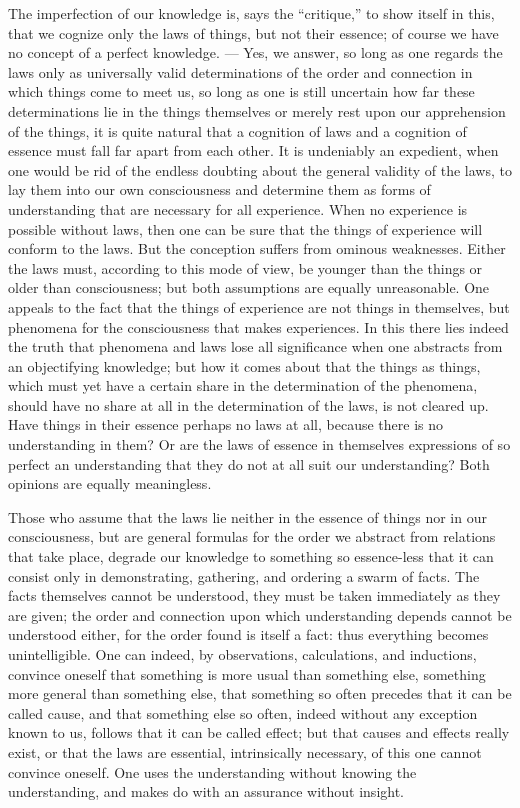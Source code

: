 \documentclass[12pt]{book}
\begin{document}
The imperfection of our knowledge is, says the ``critique,'' to show itself in
this, that we cognize only the laws of things, but not their essence; of course
we have no concept of a perfect knowledge. --- Yes, we answer, so long as one
regards the laws only as universally valid determinations of the order and
connection in which things come to meet us, so long as one is still uncertain
how far these determinations lie in the things themselves or merely rest upon
our apprehension of the things, it is quite natural that a cognition of laws
and a cognition of essence must fall far apart from each other. It is
undeniably an expedient, when one would be rid of the endless doubting about
the general validity of the laws, to lay them into our own consciousness and
determine them as forms of understanding that are necessary for all experience.
When no experience is possible without laws, then one can be sure that the
things of experience will conform to the laws. But the conception suffers from
ominous weaknesses. Either the laws must, according to this mode of view, be
younger than the things or older than consciousness; but both assumptions are
equally unreasonable. One appeals to the fact that the things of experience are
not things in themselves, but phenomena for the consciousness that makes
experiences. In this there lies indeed the truth that phenomena and laws lose
all significance when one abstracts from an objectifying knowledge; but how it
comes about that the things as things, which must yet have a certain share in
the determination of the phenomena, should have no share at all in the
determination of the laws, is not cleared up. Have things in their essence
perhaps no laws at all, because there is no understanding in them? Or are the
laws of essence in themselves expressions of so perfect an understanding that
they do not at all suit our understanding? Both opinions are equally
meaningless.

Those who assume that the laws lie neither in the essence of things nor in our
consciousness, but are general formulas for the order we abstract from
relations that take place, degrade our knowledge to something so essence-less
that it can consist only in demonstrating, gathering, and ordering a swarm of
facts. The facts themselves cannot be understood, they must be taken
immediately as they are given; the order and connection upon which understanding
depends cannot be understood either, for the order found is itself a fact: thus
everything becomes unintelligible. One can indeed, by observations,
calculations, and inductions, convince oneself that something is more usual than
something else, something more general than something else, that something so
often precedes that it can be called cause, and that something else so often,
indeed without any exception known to us, follows that it can be called effect;
but that causes and effects really exist, or that the laws are essential,
intrinsically necessary, of this one cannot convince oneself. One uses the
understanding without knowing the understanding, and makes do with an assurance
without insight.
\end{document}
